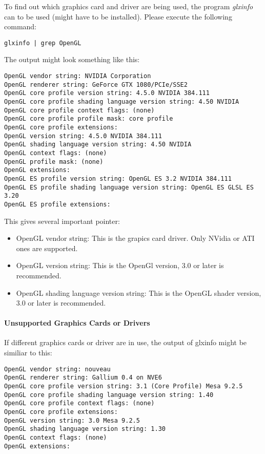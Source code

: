 To find out which graphics card and driver are being used, the program \textit{glxinfo} can to be used (might have to be installed). Please execute the following command:

\begin{verbatim}
glxinfo | grep OpenGL
\end{verbatim}

The output might look something like this:

\begin{verbatim}
OpenGL vendor string: NVIDIA Corporation
OpenGL renderer string: GeForce GTX 1080/PCIe/SSE2
OpenGL core profile version string: 4.5.0 NVIDIA 384.111
OpenGL core profile shading language version string: 4.50 NVIDIA
OpenGL core profile context flags: (none)
OpenGL core profile profile mask: core profile
OpenGL core profile extensions:
OpenGL version string: 4.5.0 NVIDIA 384.111
OpenGL shading language version string: 4.50 NVIDIA
OpenGL context flags: (none)
OpenGL profile mask: (none)
OpenGL extensions:
OpenGL ES profile version string: OpenGL ES 3.2 NVIDIA 384.111
OpenGL ES profile shading language version string: OpenGL ES GLSL ES 3.20
OpenGL ES profile extensions:
\end{verbatim}

This gives several important pointer:

\begin{itemize}  
\item OpenGL vendor string: This is the grapics card driver. Only NVidia or ATI ones are supported.
\item OpenGL version string: This is the OpenGl version, 3.0 or later is recommended.
\item OpenGL shading language version string: This is the OpenGL shader version, 3.0 or later is recommended.
\end{itemize}

\paragraph{Unsupported Graphics Cards or Drivers}

If different graphics cards or driver are in use, the output of glxinfo might be similiar to this:

\begin{verbatim}
OpenGL vendor string: nouveau
OpenGL renderer string: Gallium 0.4 on NVE6
OpenGL core profile version string: 3.1 (Core Profile) Mesa 9.2.5
OpenGL core profile shading language version string: 1.40
OpenGL core profile context flags: (none)
OpenGL core profile extensions:
OpenGL version string: 3.0 Mesa 9.2.5
OpenGL shading language version string: 1.30
OpenGL context flags: (none)
OpenGL extensions:
\end{verbatim}

